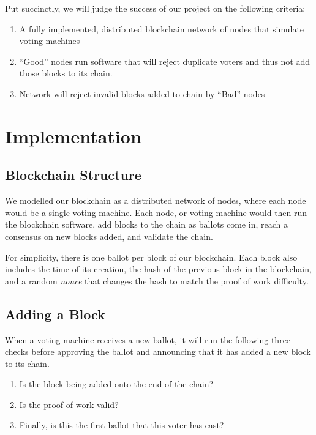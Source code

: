 \documentclass[conference]{IEEEtran}
\begin{document}
Put succinctly, we will judge the success of our project on the following criteria:
\begin{enumerate}
    \item A fully implemented, distributed blockchain network of nodes that simulate voting machines
    \item “Good” nodes run software that will reject duplicate voters and thus not add those blocks to its chain.
    \item Network will reject invalid blocks added to chain by “Bad” nodes
\end{enumerate}

\section{Implementation}

\subsection{Blockchain Structure}

We modelled our blockchain as a distributed network of nodes, where each node would be a single voting machine. Each node, or voting machine would then run the blockchain software, add blocks to the chain as ballots come in, reach a consensus on new blocks added, and validate the chain.

For simplicity, there is one ballot per block of our blockchain. Each block also includes the time of its creation, the hash of the previous block in the blockchain, and a random \textit{nonce} that changes the hash to match the proof of work difficulty.

\subsection{Adding a Block}

When a voting machine receives a new ballot, it will run the following three checks before approving the ballot and announcing that it has added a new block to its chain.

\begin{enumerate}
    \item Is the block being added onto the end of the chain?
    \item Is the proof of work valid?
    \item Finally, is this the first ballot that this voter has cast?
\end{enumerate}
\end{document}
